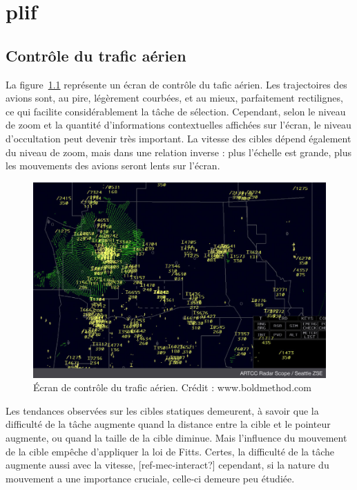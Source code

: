 
\chapter[Contexte/Besoin/Applications]{plif}
\minitoc
\label{chap1}
\cleardoublepage

    \section{Contrôle du trafic aérien}
    La figure~\ref{fig:airtraffic} représente un écran de contrôle du tafic aérien. Les trajectoires des avions sont, au pire, légèrement courbées, et au mieux, parfaitement rectilignes, ce qui facilite considérablement la tâche de sélection. Cependant, selon le niveau de zoom et la quantité d'informations contextuelles affichées sur l'écran, le niveau d'occultation peut devenir très important. La vitesse des cibles dépend également du niveau de zoom, mais dans une relation inverse : plus l'échelle est grande, plus les mouvements des avions seront lents sur l'écran.
    
	\begin{figure}[h]
		\centering
		\includegraphics[width=\textwidth]{figures/Radar-Scope-ZSE}
		\caption{Écran de contrôle du trafic aérien. Crédit : www.boldmethod.com}
		\label{fig:airtraffic}
	\end{figure}
    
    Les tendances observées sur les cibles statiques demeurent, à savoir que la difficulté de la tâche augmente quand la distance entre la cible et le pointeur augmente, ou quand la taille de la cible diminue. Mais l'influence du mouvement de la cible empêche d'appliquer la loi de Fitts. Certes, la difficulté de la tâche augmente aussi avec la vitesse, [ref-mec-interact?] cependant, si la nature du mouvement a une importance cruciale, celle-ci demeure peu étudiée.
    
